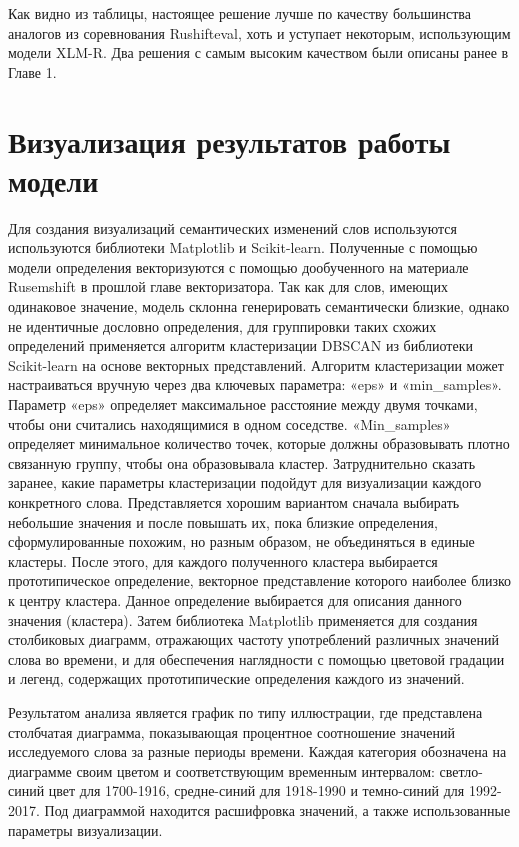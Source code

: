 \documentclass[LI,VKR]{HSEUniversity}
\begin{document}
Как видно из таблицы, настоящее решение лучше по качеству
большинства аналогов из соревнования Rushifteval,
хоть и уступает некоторым, использующим модели XLM-R.
Два решения с самым высоким качеством были описаны ранее в Главе 1.

\section{Визуализация результатов работы модели}

Для создания визуализаций семантических изменений слов используются используются библиотеки
Matplotlib и Scikit-learn.
Полученные с помощью модели определения векторизуются с помощью дообученного
на материале Rusemshift в прошлой главе векторизатора.
Так как для слов, имеющих одинаковое значение,
модель склонна генерировать семантически близкие, однако не идентичные дословно определения,
для группировки таких схожих определений применяется алгоритм кластеризации DBSCAN из
библиотеки Scikit-learn на основе векторных представлений.
Алгоритм кластеризации может настраиваться вручную через два ключевых параметра:
«eps» и «min\_samples».
Параметр «eps» определяет максимальное расстояние между двумя точками,
чтобы они считались находящимися в одном соседстве.
«Min\_samples» определяет минимальное количество точек,
которые должны образовывать плотно связанную группу, чтобы она образовывала кластер.
Затруднительно сказать заранее, какие параметры кластеризации подойдут для визуализации
каждого конкретного слова.
Представляется хорошим вариантом сначала выбирать небольшие значения и после повышать их,
пока близкие определения, сформулированные похожим, но разным образом,
не объединяться в единые кластеры.
После этого, для каждого полученного кластера выбирается прототипическое определение,
векторное представление которого наиболее близко к центру кластера.
Данное определение выбирается для описания данного значения (кластера).
Затем библиотека Matplotlib применяется для создания столбиковых диаграмм,
отражающих частоту употреблений различных значений слова во времени,
и для обеспечения наглядности с помощью цветовой градации и легенд,
содержащих прототипические определения каждого из значений.

Результатом анализа является график по типу иллюстрации, где представлена столбчатая диаграмма,
показывающая процентное соотношение значений исследуемого слова за разные периоды времени.
Каждая категория обозначена на диаграмме своим цветом и соответствующим временным интервалом:
светло-синий цвет для 1700-1916, средне-синий для 1918-1990 и темно-синий для 1992-2017.
Под диаграммой находится расшифровка значений, а также использованные параметры визуализации.
\end{document}
